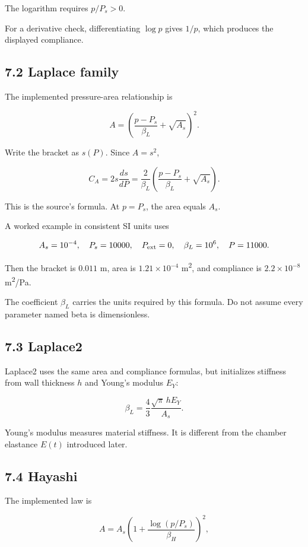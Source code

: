 \documentclass[11pt,a4paper]{article}
\begin{document}
The logarithm requires \(p/P_s>0\).

For a derivative check, differentiating \(\log p\) gives \(1/p\), which produces the displayed compliance.

\subsection{7.2 Laplace family}
The implemented pressure-area relationship is


\begingroup\small
\[
A=\left(\frac{p-P_s}{\beta_L}+\sqrt{A_s}\right)^2.
\]
\endgroup


Write the bracket as \(s(P)\). Since \(A=s^2\),


\begingroup\small
\[
C_A=2s\frac{ds}{dP}
=\frac{2}{\beta_L}
\left(\frac{p-P_s}{\beta_L}+\sqrt{A_s}\right).
\]
\endgroup


This is the source's formula. At \(p=P_s\), the area equals \(A_s\).

A worked example in consistent SI units uses


\begingroup\small
\[
A_s=10^{-4},\quad
P_s=10000,\quad
P_{\rm ext}=0,\quad
\beta_L=10^6,\quad
P=11000.
\]
\endgroup


Then the bracket is \(0.011\) m, area is \(1.21\times10^{-4}\) m\textsuperscript{2}, and compliance is \(2.2\times10^{-8}\) m\textsuperscript{2}/Pa.

The coefficient \(\beta_L\) carries the units required by this formula. Do not assume every parameter named beta is dimensionless.

\subsection{7.3 Laplace2}
Laplace2 uses the same area and compliance formulas, but initializes stiffness from wall thickness \(h\) and Young's modulus \(E_Y\):


\begingroup\small
\[
\beta_L=\frac43
\frac{\sqrt{\pi}\,h E_Y}{A_s}.
\]
\endgroup


Young's modulus measures material stiffness. It is different from the chamber elastance \(E(t)\) introduced later.

\subsection{7.4 Hayashi}
The implemented law is


\begingroup\small
\[
A=A_s\left(1+\frac{\log(p/P_s)}{\beta_H}\right)^2,
\]
\endgroup
\end{document}
